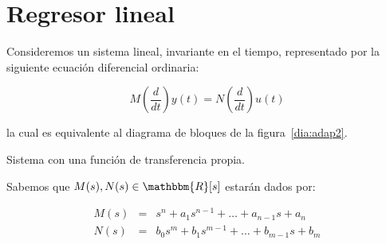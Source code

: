     \newpage
    \section{Regresor lineal}

        Consideremos un sistema lineal, invariante en el tiempo, representado por la siguiente ecuación diferencial ordinaria:

        \begin{equation} \label{eq:adap1}
            M \left( \frac{d}{dt} \right) y(t) = N \left( \frac{d}{dt} \right) u(t)
        \end{equation}

        la cual es equivalente al diagrama de bloques de la figura~\ref{dia:adap2}.

        \begin{marginfigure}
            \centering
            \caption{\label{dia:adap2}Sistema con una función de transferencia propia.}
        \end{marginfigure}

        Sabemos que $M(s), N(s) \in \mathbbm{R}[s]$ estarán dados por:

        \begin{eqnarray} \label{eq:adap2}
            M(s) & = & s^n + a_1 s^{n-1} + \dots + a_{n-1} s + a_n \nonumber \\
            N(s) & = & b_0 s^m + b_1 s^{m-1} + \dots + b_{m-1} s + b_m
        \end{eqnarray}

